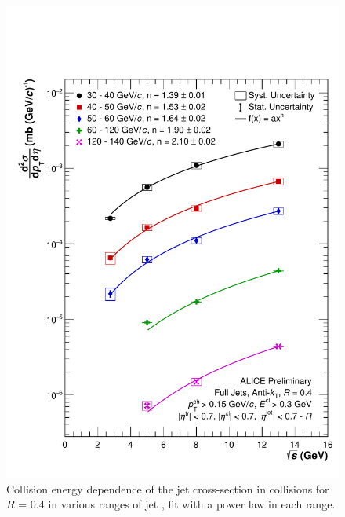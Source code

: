 \begin{figure}[h!]
    \centering
    \includegraphics[width=15cm]{figures/EnergyComparisons/sqrtSComp_R04.pdf}
    \caption{Collision energy dependence of the jet cross-section in \pp collisions for $R$ = 0.4 in various ranges of jet \pT, fit with a power law in each \pT range.}
    \label{fig:appSqrtSCompareR04}
\end{figure}

